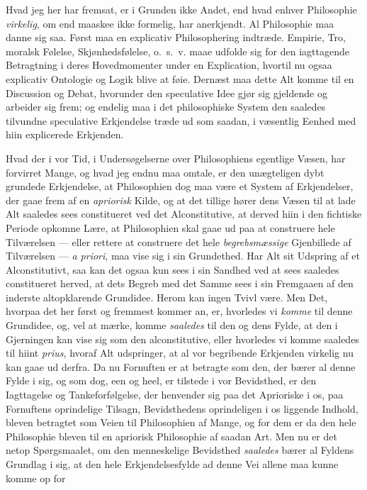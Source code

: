 \documentclass[12pt,a4paper]{book}
\newcommand{\apage}[1]{\marginnote{\footnotesize\textit{[#1]}}}
\begin{document}
Hvad jeg her har fremsat, er i Grunden ikke Andet, end hvad enhver
Philosophie \emph{virkelig}, om end maaskee ikke formelig, har anerkjendt. Al
Philosophie maa danne sig saa. Først maa en explicativ Philosophering
indtræde. Empirie, Tro, moralsk Følelse, Skjønhedsfølelse, o.\ s.\ v.
maae udfolde sig for den iagttagende Betragtning i deres Hovedmomenter
under en Explication, hvortil nu ogsaa explicativ Ontologie og Logik
blive at føie. Dernæst maa dette Alt komme til en Discussion og Debat,
hvorunder den speculative Idee gjør sig gjeldende og arbeider sig frem;
\apage{66} og endelig maa i det philosophiske System den saaledes tilvundne
speculative Erkjendelse træde ud som saadan, i væsentlig Eenhed med
hiin explicerede Erkjenden.

Hvad der i vor Tid, i Undersøgelserne over Philosophiens egentlige
Væsen, har forvirret Mange, og hvad jeg endnu maa omtale, er den
unægteligen dybt grundede Erkjendelse, at Philosophien dog maa være et
System af Erkjendelser, der gaae frem af en \emph{apriorisk} Kilde, og at det
tillige hører dens Væsen til at lade Alt saaledes sees constitueret ved
det Alconstitutive, at derved hiin i den fichtiske Periode opkomne
Lære, at Philosophien skal gaae ud paa at construere hele Tilværelsen
--- eller rettere at construere det hele \emph{begrebsmæssige} Gjenbillede af
Tilværelsen --- \textit{a priori}, maa vise sig i sin Grundethed. Har
Alt sit Udspring af et Alconstitutivt, saa kan det ogsaa kun sees i sin
Sandhed ved at sees saaledes constitueret herved, at dets Begreb med
det Samme sees i sin Fremgaaen af den inderste altopklarende Grundidee.
Herom kan ingen Tvivl være. Men Det, hvorpaa det her først og fremmest
kommer an, er, hvorledes vi \emph{komme} til denne Grundidee, og, vel at
mærke, komme \emph{saaledes} til den og dens Fylde, at den i Gjerningen kan
vise sig som den alconstitutive, eller hvorledes vi komme saaledes til
hiint \textit{prius}, hvoraf Alt udspringer, at al vor begribende
Erkjenden virkelig nu kan gaae ud derfra. Da nu Fornuften er at
betragte som den, der bærer al denne Fylde i sig, og som dog, een og
heel, er tilstede i vor Bevidsthed, er den Iagttagelse og
Tankeforfølgelse, der henvender sig paa det Aprioriske i os, paa
Fornuftens oprindelige Tilsagn, Bevidsthedens oprindeligen i os
liggende Indhold, bleven betragtet som Veien til Philosophien af Mange,
og for dem er da den hele Philosophie bleven til en apriorisk
Philosophie af saadan Art. Men nu er det netop Spørgsmaalet, om den
menneskelige Bevidsthed \emph{saaledes} bærer al Fyldens Grundlag i sig, at
den hele Erkjendelsesfylde ad denne Vei allene maa kunne komme op for
\end{document}
